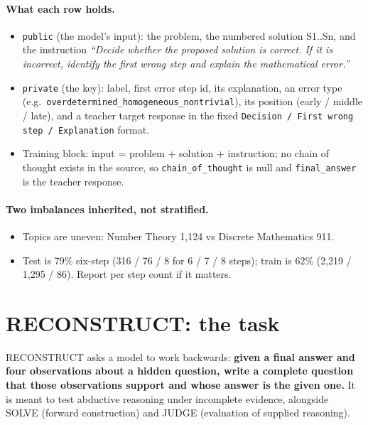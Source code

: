 \documentclass[11pt,a4paper]{article}
\newcommand{\code}[1]{\texttt{#1}}
\begin{document}
\paragraph{What each row holds.}
\begin{itemize}
\item \code{public} (the model's input): the problem, the numbered solution S1..Sn, and the instruction \emph{``Decide whether the proposed solution is correct. If it is incorrect, identify the first wrong step and explain the mathematical error.''}
\item \code{private} (the key): label, first error step id, its explanation, an error type (e.g.\ \nolinkurl{overdetermined_homogeneous_nontrivial}), its position (early / middle / late), and a teacher target response in the fixed \code{Decision / First wrong step / Explanation} format.
\item Training block: input = problem + solution + instruction; no chain of thought exists in the source, so \code{chain\_of\_thought} is null and \code{final\_answer} is the teacher response.
\end{itemize}

\paragraph{Two imbalances inherited, not stratified.}
\begin{itemize}
\item Topics are uneven: Number Theory 1,124 vs Discrete Mathematics 911.
\item Test is 79\% six-step (316 / 76 / 8 for 6 / 7 / 8 steps); train is 62\% (2,219 / 1,295 / 86). Report per step count if it matters.
\end{itemize}

\section{RECONSTRUCT: the task}

RECONSTRUCT asks a model to work backwards: \textbf{given a final answer and four observations about a hidden question, write a complete question that those observations support and whose answer is the given one.} It is meant to test abductive reasoning under incomplete evidence, alongside SOLVE (forward construction) and JUDGE (evaluation of supplied reasoning).
\end{document}
